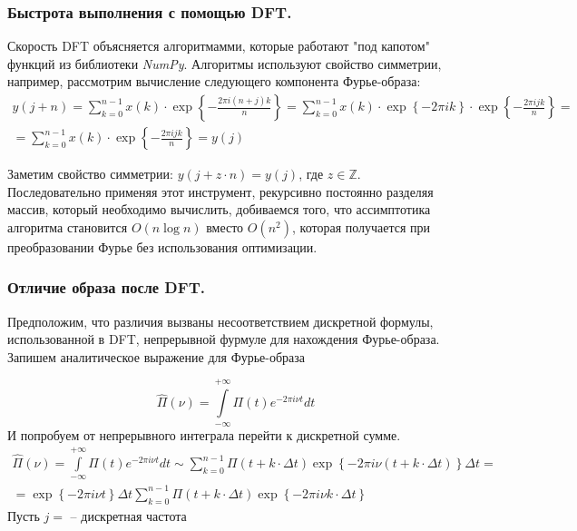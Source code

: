 \documentclass[a5paper, 10pt]{article}
\theoremstyle{definition}
\theoremstyle{plain}
\theoremstyle{remark}
\begin{document}
\subsubsection{ Быстрота выполнения с помощью DFT.}
Скорость DFT объясняется алгоритмамми, которые работают "под капотом" функций из библиотеки \textit{NumPy}. Алгоритмы используют свойство симметрии, например, рассмотрим вычисление следующего компонента Фурье-образа:
\begin{multline}
y(j + n) = \sum \limits_{k=0}^{n-1} x(k) \cdot \exp \left\{ - \frac{2\pi  i (n + j) k}{n} \right\} =  \sum \limits_{k=0}^{n-1} x(k) \cdot \exp \left\{ - 2\pi  i  k \right\} \cdot \exp \left\{ - \frac{2\pi  i  j k}{n} \right\} =\\= \sum \limits_{k=0}^{n-1} x(k) \cdot \exp \left\{ - \frac{2\pi  i  j k}{n} \right\} = y(j)
\end{multline}

Заметим свойство симметрии: $y(j + z \cdot n) = y(j)$, где $z \in \mathbb{Z}$.\\

 Последовательно применяя этот инструмент, рекурсивно постоянно разделяя массив, который необходимо вычислить, добиваемся того, что ассимптотика алгоритма становится $O(n \log n)$ вместо $O(n^2)$, которая получается при преобразовании Фурье без использования оптимизации.


\newpage
\subsubsection{Отличие образа после DFT.}

Предположим, что различия вызваны несоответствием дискретной формулы, использованной в DFT, непрерывной фурмуле для нахождения Фурье-образа. Запишем аналитическое выражение для Фурье-образа

\begin{equation}
\hat{\Pi}(\nu) = \int \limits_{-\infty}^{+\infty} \Pi(t) e^{-2\pi i \nu t} dt
\end{equation}
И попробуем от непрерывного интеграла перейти к дискретной сумме. 
\begin{multline}
\hat{\Pi}(\nu) = \int \limits_{-\infty}^{+\infty} \Pi(t) e^{-2\pi i \nu t} dt \sim \sum \limits_{k=0}^{n-1} \Pi(t + k \cdot \Delta t)  \exp \left\{ - 2\pi  i \nu (t + k \cdot \Delta t) \right\} \Delta t = \\ = \exp \left\{ - 2\pi  i \nu t \right\} \Delta t  \sum \limits_{k=0}^{n-1} \Pi(t + k \cdot \Delta t)  \exp \left\{ - 2\pi  i \nu  k \cdot \Delta t\right\}
\end{multline}
Пусть $j =  $ -- дискретная частота
\end{document}
